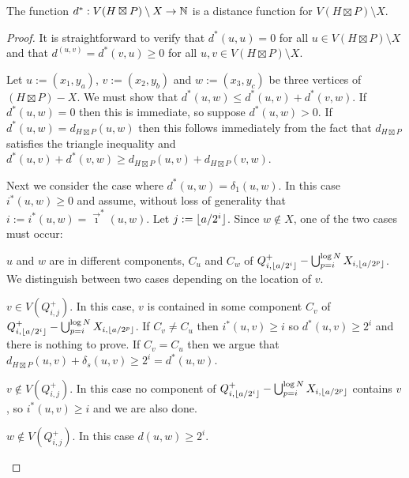 \documentclass{patmorin}
\renewcommand{\ge}{\geqslant}
\renewcommand{\le}{\leqslant}
\begin{document}
\begin{lem}
  The function $d^*:V(H\boxtimes P)\setminus X\to\mathbb{N}$ is a distance function for $V(H\boxtimes P)\setminus X$.
\end{lem}

\begin{proof}
  It is straightforward to verify that $d^*(u,u)=0$ for all $u\in V(H\boxtimes P)\setminus X$ and that $d^(u,v)=d^*(v,u)\ge 0$ for all $u,v\in V(H\boxtimes P)\setminus X$.

  Let $u:=(x_1,y_a)$, $v:=(x_2,y_b)$ and $w:=(x_3,y_c)$ be three vertices of $(H\boxtimes P)- X$.
  We must show that $d^*(u,w)\le d^*(u,v)+d^*(v,w)$.  If $d^*(u,w)=0$ then this is immediate, so suppose $d^*(u,w)>0$.   If $d^*(u,w)=d_{H\boxtimes P}(u,w)$ then this follows immediately from the fact that $d_{H\boxtimes P}$ satisfies the triangle inequality and $d^*(u,v) + d^*(v,w)\ge d_{H\boxtimes P}(u,v)+d_{H\boxtimes P}(v,w)$.

  Next we consider the case where $d^*(u,w)=\delta_1(u,w)$.
  In this case $i^*(u,w)\ge 0$ and assume, without loss of generality that $i:=i^*(u,w)=\overrightarrow\imath^*(u,w)$.  Let $j:={\lfloor a/2^i \rfloor}$.  Since $w\not\in X$, one of the two cases must occur:
  \begin{compactenum}
    \item $u$ and $w$ are in different components, $C_u$ and $C_w$ of $Q^+_{i,{\lfloor a/2^i \rfloor}}-\bigcup_{p=i}^{\log N} X_{i,\lfloor a/2^p\rfloor}$.  We distinguish between two cases depending on the location of $v$.
    \begin{compactenum}
      \item $v\in V(Q^+_{i,j})$.  In this case, $v$ is contained in some component $C_v$ of $Q^+_{i,{\lfloor a/2^i \rfloor}}-\bigcup_{p=i}^{\log N} X_{i,\lfloor a/2^p\rfloor}$.  If $C_v\neq C_u$ then $i^*(u,v)\ge i$ so $d^*(u,v)\ge 2^i$ and there is nothing to prove.  If $C_v=C_u$ then we argue that $d_{H\boxtimes P}(u,v)+\delta_s(u,v)\ge 2^i=d^*(u,w)$.
      \item $v\not\in V(Q^+_{i,j})$.  In this case no component of $Q^+_{i,{\lfloor a/2^i \rfloor}}-\bigcup_{p=i}^{\log N} X_{i,\lfloor a/2^p\rfloor}$ contains $v$, so $i^*(u,v)\ge i$ and we are also done.
    \end{compactenum}
    \item $w\not\in V(Q^+_{i,j})$.  In this case $d(u,w)\ge 2^i$.
  \end{compactenum}
\end{proof}
\end{document}
